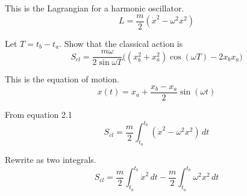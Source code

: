 \documentclass[12pt]{article}
\begin{document}
\noindent
This is the Lagrangian for a harmonic oscillator.
\begin{equation*}
L=\frac{m}{2}(\dot{x}^2-\omega^2 x^2)
\end{equation*}

\noindent
Let $T=t_b-t_a$.
Show that the classical action is
\begin{equation*}
S_{cl}=\frac{m\omega}{2\sin\omega T}
\bigg((x_b^2+x_a^2)\cos(\omega T)-2x_b x_a\bigg)
\end{equation*}

\noindent
This is the equation of motion.
\begin{equation*}
x(t)=x_a+\frac{x_b-x_a}{2}\sin(\omega t)
\end{equation*}

\noindent
From equation 2.1
\begin{equation*}
S_{cl}=\frac{m}{2}\int_{t_a}^{t_b} (\dot{x}^2-\omega^2 x^2)\,dt
\end{equation*}

\noindent
Rewrite as two integrals.
\begin{equation*}
S_{cl}=\frac{m}{2}\int_{t_a}^{t_b} \dot{x}^2\,dt
-\frac{m}{2}\int_{t_a}^{t_b}\omega^2 x^2\,dt
\end{equation*}
\end{document}
